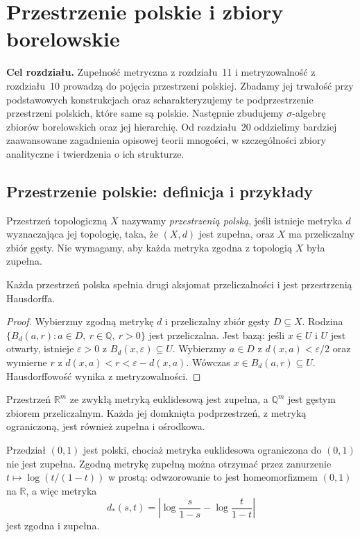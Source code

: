 \chapter{Przestrzenie polskie i zbiory borelowskie}
\label{ch:topog-polskie-borelowskie}

\providecommand{\atlasref}[2]{#2}

\noindent\textbf{Cel rozdziału.}
Zupełność metryczna z rozdziału~11 i metryzowalność
z rozdziału~10 prowadzą do pojęcia przestrzeni
polskiej. Zbadamy jej trwałość przy podstawowych
konstrukcjach oraz scharakteryzujemy te podprzestrzenie
przestrzeni polskich, które same są polskie.
Następnie zbudujemy $\sigma$-algebrę zbiorów
borelowskich oraz jej hierarchię.
Od rozdziału~20 oddzielimy bardziej zaawansowane
zagadnienia opisowej teorii mnogości, w szczególności
zbiory analityczne i twierdzenia o ich strukturze.

\section{Przestrzenie polskie: definicja i przykłady}
\label{sec:topog-polskie-definicja}

\begin{definicja}
\label{def:topog-polskie}
Przestrzeń topologiczną $X$ nazywamy
\emph{przestrzenią polską}, jeśli istnieje
metryka $d$ wyznaczająca jej topologię,
taka, że $(X,d)$ jest zupełna,
oraz $X$ ma przeliczalny zbiór gęsty.
Nie wymagamy, aby każda metryka
zgodna z topologią $X$ była zupełna.
\end{definicja}

\begin{stwierdzenie}
\label{prop:topog-polskie-drugi-aksjomat}
Każda przestrzeń polska spełnia
drugi aksjomat przeliczalności
i jest przestrzenią Hausdorffa.
\end{stwierdzenie}
\begin{proof}
Wybierzmy zgodną metrykę $d$
i przeliczalny zbiór gęsty $D\subseteq X$.
Rodzina
$\{B_d(a,r):a\in D,\ r\in\mathbb Q,\ r>0\}$
jest przeliczalna. Jest bazą:
jeśli $x\in U$ i $U$ jest otwarty,
istnieje $\varepsilon>0$ z
$B_d(x,\varepsilon)\subseteq U$.
Wybierzmy $a\in D$ z
$d(x,a)<\varepsilon/2$
oraz wymierne $r$ z
$d(x,a)<r<\varepsilon-d(x,a)$.
Wówczas
$x\in B_d(a,r)\subseteq U$.
Hausdorffowość wynika z metryzowalności.
\end{proof}

\begin{przyklad}
\label{ex:topog-polskie-podstawowe}
Przestrzeń $\mathbb R^m$ ze zwykłą
metryką euklidesową jest zupełna,
a $\mathbb Q^m$ jest gęstym zbiorem
przeliczalnym. Każda jej domknięta
podprzestrzeń, z metryką ograniczoną,
jest również zupełna i ośrodkowa.

Przedział $(0,1)$ jest polski,
chociaż metryka euklidesowa
ograniczona do $(0,1)$ nie jest
zupełna. Zgodną metrykę zupełną
można otrzymać przez zanurzenie
$t\mapsto\log(t/(1-t))$
w prostą: odwzorowanie to jest
homeomorfizmem $(0,1)$ na $\mathbb R$,
a więc metryka
\[
d_\ast(s,t)=
\left|\log\frac{s}{1-s}
-\log\frac{t}{1-t}\right|
\]
jest zgodna i zupełna.
\end{przyklad}

